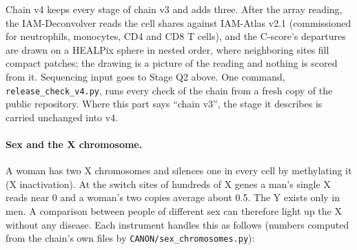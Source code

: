 Chain v4 keeps every stage of chain v3 and adds three. After the array reading, the IAM-Deconvolver reads the cell shares
against IAM-Atlas v2.1 (commissioned for neutrophils, monocytes, CD4 and CD8 T cells), and the C-score's departures are drawn on a
HEALPix sphere in nested order, where neighboring sites fill compact patches; the drawing is a picture of the reading and nothing is
scored from it. Sequencing input goes to Stage Q2 above. One command, \texttt{release\_check\_v4.py}, runs every check of the chain
from a fresh copy of the public repository. Where this part says ``chain v3'', the stage it describes is carried unchanged into v4.

\paragraph{Sex and the X chromosome.} A woman has two X chromosomes and silences one in every cell by methylating it (X inactivation). At the switch sites of hundreds of X genes a man's single X reads near 0 and a woman's two copies average about 0.5. The Y exists only in men. A comparison between people of different sex can therefore light up the X without any disease. Each instrument handles this as follows (numbers computed from the chain's own files by \texttt{CANON/sex\_chromosomes.py}):
